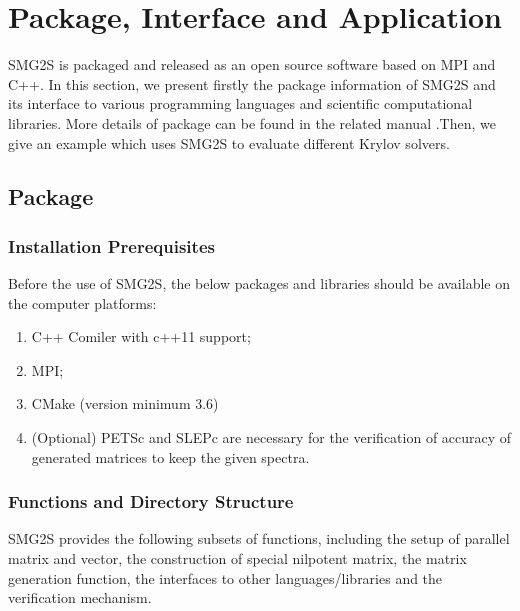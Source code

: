 \section{Package, Interface and Application}\label{Package, Interface and Application}

SMG2S is packaged and released as an open source software based on MPI and C++. In this section, we present firstly the package information of SMG2S and its interface to various programming languages and scientific computational libraries. More details of package can be found in the related manual \cite{wu2018smg2s}.Then, we give an example which uses SMG2S to evaluate different Krylov solvers. 

\subsection{Package}

\subsubsection{Installation Prerequisites}

Before the use of SMG2S, the below packages and libraries should be available on the computer platforms:

\begin{enumerate}
	\item C++ Comiler with c++11 support;
	\item MPI;
	\item CMake (version minimum 3.6)
	\item (Optional) PETSc and SLEPc are necessary for the verification of accuracy of generated matrices to keep the given spectra.
\end{enumerate}

\subsubsection{Functions and Directory Structure}

SMG2S provides the following subsets of functions, including the setup of parallel matrix and vector, the construction of special nilpotent matrix, the matrix generation function, the interfaces to other languages/libraries and the verification mechanism.

